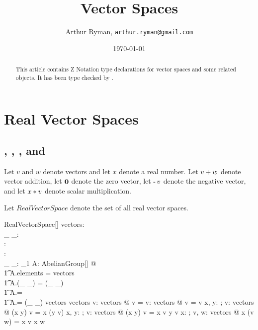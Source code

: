 \documentclass[11pt, oneside]{article}
\title{Vector Spaces}
\author{Arthur Ryman, {\tt arthur.ryman@gmail.com}}
\date{\today}
\begin{document}
\maketitle

\begin{abstract}
This article contains Z Notation type declarations for vector spaces and some related objects.
It has been type checked by \fuzz.
\end{abstract}

\section{Real Vector Spaces}

\subsection{, , , and }

Let $v$ and $w$ denote vectors and let $x$ denote a real number.
Let $v \mathbin{+} w$ denote vector addition,
let $\mathbf{0}$ denote the zero vector,
let $\operatorname{-} v$ denote the negative vector,
and let $x \mathbin{*} v$ denote scalar multiplication.

Let $RealVectorSpace$ denote the set of all real vector spaces.

\begin{schema}{RealVectorSpace}[\genT]
	vectors: \power \genT \\
	\_ \addV \_: \genT \cross \genT \pfun \genT \\
	\zeroV: \genT \\
	\negV: \genT \pfun \genT \\
	\_ \mulS \_: \R \cross \genT \pfun \genT
	\where
	\exists_1 A: AbelianGroup[\genT] @ \\
	\t1	A.elements = vectors \land \\
	\t1	A.(\_ \addG \_) = (\_ \addV \_) \land \\
	\t1	A.\zeroG = \zeroV \land \\
	\t1	A.\negG = \negV
	\also
	(\_ \mulS \_) \in \R \cross vectors \fun vectors
	\also
	\forall v: vectors @ \zeroR \mulS v = \zeroV
	\also
	\forall v: vectors @ \oneR \mulS v = v
	\also
	\forall x, y: \R; v: vectors @ (x \mulR y) \mulS v = x \mulS (y \mulS v)
	\also
	\forall x, y: \R; v: vectors @ (x \addR y) \mulS v = x \mulS v \addV y \mulS v
	\also
	\forall x: \R; v, w: vectors @ x \mulS (v \addV w) = x \mulS v \addV x \mulS w
\end{schema}
\end{document}
